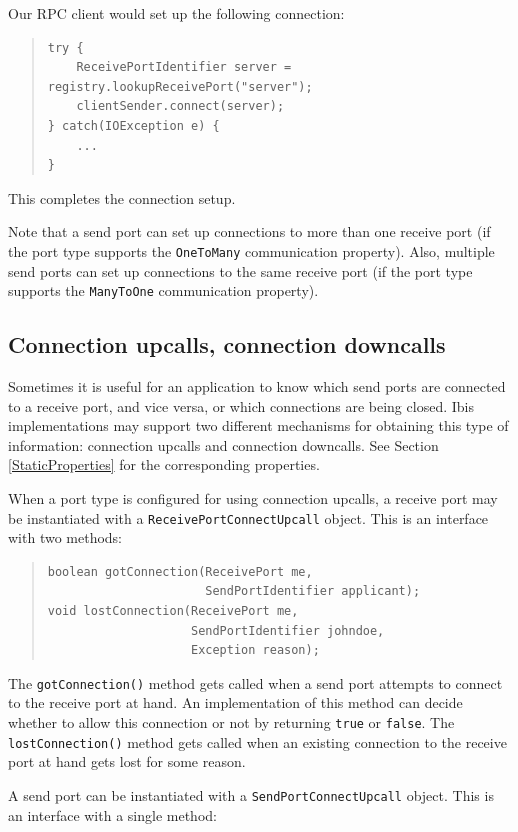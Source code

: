 \documentclass[10pt]{article}
\newcommand{\mysubsection}[1]{\subsection{#1}\label{#1}}
\begin{document}
\noindent
Our RPC client would set up the following connection:

\begin{quote}
\begin{verbatim}
try {
    ReceivePortIdentifier server = registry.lookupReceivePort("server");
    clientSender.connect(server);
} catch(IOException e) {
    ...
}
\end{verbatim}
\end{quote}

This completes the connection setup.

Note that a send port can set up connections to more than one
receive port (if the port type supports the \texttt{OneToMany}
communication property). Also, multiple send ports can set up
connections to the same receive port (if the port type supports
the \texttt{ManyToOne} communication property).

\mysubsection{Connection upcalls, connection downcalls}

Sometimes it is useful for an application to know which send ports
are connected to a receive port, and vice versa, or which connections
are being closed.
Ibis implementations may support two different mechanisms for obtaining
this type of information: connection upcalls and connection downcalls.
See Section \ref{StaticProperties} for the corresponding properties.

When a port type is configured for using connection upcalls,
a receive port may be instantiated with a \texttt{ReceivePortConnectUpcall}
object. This is an interface with two methods:

\begin{quote}
\begin{verbatim}
boolean gotConnection(ReceivePort me,
                      SendPortIdentifier applicant);
void lostConnection(ReceivePort me,
                    SendPortIdentifier johndoe,
                    Exception reason);
\end{verbatim}
\end{quote}
\noindent 
The \texttt{gotConnection()} method gets called when a send port attempts
to connect to the receive port at hand.
An implementation of this method can decide whether
to allow this connection or not by returning \texttt{true} or \texttt{false}.
The \texttt{lostConnection()} method gets called when an existing connection
to the receive port at hand gets lost for some reason.

A send port can be instantiated with a
\texttt{SendPortConnectUpcall} object. This is an interface with a single method:
\end{document}
